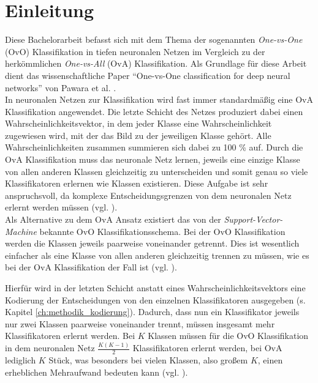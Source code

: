 \chapter{Einleitung}
\label{ch:einleitung}


Diese Bachelorarbeit befasst sich mit dem Thema der sogenannten \textit{One-vs-One} (OvO) Klassifikation in tiefen neuronalen Netzen im Vergleich zu der herkömmlichen \textit{One-vs-All} (OvA) Klassifikation. Als Grundlage für diese Arbeit dient das wissenschaftliche Paper \enquote{One-vs-One classification for deep neural networks} von Pawara et al. \cite{pawaraPaper}.\\

In neuronalen Netzen zur Klassifikation wird fast immer standardmäßig eine OvA Klassifikation angewendet. Die letzte Schicht des Netzes produziert dabei einen Wahrscheinlichkeitsvektor, in dem jeder Klasse eine Wahrscheinlichkeit zugewiesen wird, mit der das Bild zu der jeweiligen Klasse gehört. Alle Wahrscheinlichkeiten zusammen summieren sich dabei zu 100 \% auf. Durch die OvA Klassifikation muss das neuronale Netz lernen, jeweils eine einzige Klasse von allen anderen Klassen gleichzeitig zu unterscheiden und somit genau so viele Klassifikatoren erlernen wie Klassen existieren. Diese Aufgabe ist sehr anspruchsvoll, da komplexe Entscheidungsgrenzen von dem neuronalen Netz erlernt werden müssen (vgl. \cite{pawaraPaper}).\\

Als Alternative zu dem OvA Ansatz existiert das von der \textit{Support-Vector-Machine} bekannte OvO Klassifikationsschema. Bei der OvO Klassifikation werden die Klassen jeweils paarweise voneinander getrennt. Dies ist wesentlich einfacher als eine Klasse von allen anderen gleichzeitig trennen zu müssen, wie es bei der OvA Klassifikation der Fall ist (vgl. \cite{pawaraPaper}).

Hierfür wird in der letzten Schicht anstatt eines Wahrscheinlichkeitsvektors eine Kodierung der Entscheidungen von den einzelnen Klassifikatoren ausgegeben (s. Kapitel \ref{ch:methodik_kodierung}).
Dadurch, dass nun ein Klassifikator jeweils nur zwei Klassen paarweise voneinander trennt, müssen insgesamt mehr Klassifikatoren erlernt werden.
Bei $K$ Klassen müssen für die OvO Klassifikation in dem neuronalen Netz $\frac{K(K-1)}{2}$ Klassifikatoren erlernt werden, bei OvA lediglich $K$ Stück, was besonders bei vielen Klassen, also großem $K$, einen erheblichen Mehraufwand bedeuten kann (vgl. \cite{pawaraPaper}).\\

